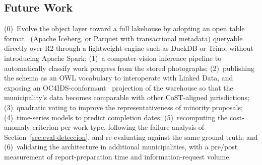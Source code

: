 \documentclass[runningheads]{llncs}
\renewcommand{\_}{\origunderscore\allowbreak}
\begin{document}
\subsection{Future Work}
(0)~Evolve the object layer toward a full lakehouse by adopting an open table format~\cite{Armbrust2020} (Apache Iceberg, or Parquet with transactional metadata) queryable directly over R2 through a lightweight engine such as DuckDB or Trino, without introducing Apache Spark; (1)~a computer-vision inference pipeline to automatically classify work progress from the stored photographs; (2)~publishing the schema as an OWL vocabulary to interoperate with Linked Data, and exposing an OC4IDS-conformant~\cite{OC4IDS} projection of the warehouse so that the municipality's data becomes comparable with other CoST-aligned jurisdictions; (3)~quadratic voting to improve the representativeness of minority proposals; (4)~time-series models to predict completion dates; (5)~recomputing the cost-anomaly criterion per work type, following the failure analysis of Section~\ref{sec:eval-deteccion}, and re-evaluating against the same ground truth; and (6)~validating the architecture in additional municipalities, with a pre/post measurement of report-preparation time and information-request volume.
\end{document}
